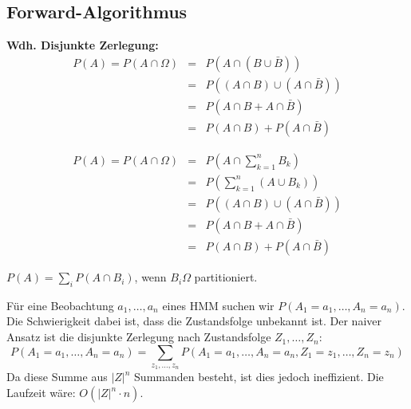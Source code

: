 \subsection{Forward-Algorithmus}
\begin{shaded}
	\noindent
	\textbf{Wdh. Disjunkte Zerlegung:}
	\begin{eqnarray*}
		P(A) = P(A \cap \Omega) &=& P(A \cap (B \cup \bar{B}))\\
								&=& P((A \cap B) \cup (A \cap \bar{B}))\\
								&=& P(A \cap B + A \cap \bar{B})\\
								&=& P(A \cap B)+P(A \cap \bar{B})
	\end{eqnarray*}
	\begin{center}
	\end{center}
	
    \begin{eqnarray*}
        P(A) = P(A \cap \Omega) &=& P(A \cap \sum\limits^n_{k=1} B_k)\\
        &=& P(\sum\limits_{k=1}^n(A \cup B_k))\\
                                &=& P((A \cap B) \cup (A \cap \bar{B}))\\
                                &=& P(A \cap B + A \cap \bar{B})\\
                                &=& P(A \cap B)+P(A \cap \bar{B})
    \end{eqnarray*}
    \begin{center}
	\end{center}
	\(P(A) = \sum_i P(A \cap B_i)\), wenn \(B_i \Omega\) partitioniert.

\end{shaded}
Für eine Beobachtung \(a_1, \dots, a_n\) eines HMM suchen wir \(P(A_1=a_1, \dots, A_n=a_n)\).
Die Schwierigkeit dabei ist, dass die Zustandsfolge unbekannt ist.
Der naiver Ansatz ist die disjunkte Zerlegung nach Zustandsfolge \(Z_1, \dots, Z_n\):
\[P(A_1=a_1, \dots, A_n=a_n) = \sum\limits_{z_1, \dots, z_n} P(A_1=a_1, \dots, A_n=a_n, Z_1=z_1, \dots, Z_n=z_n)\]
Da diese Summe aus \(|Z|^n\) Summanden besteht, ist dies jedoch ineffizient.
Die Laufzeit wäre: $O(|Z|^n\cdot n)$.

